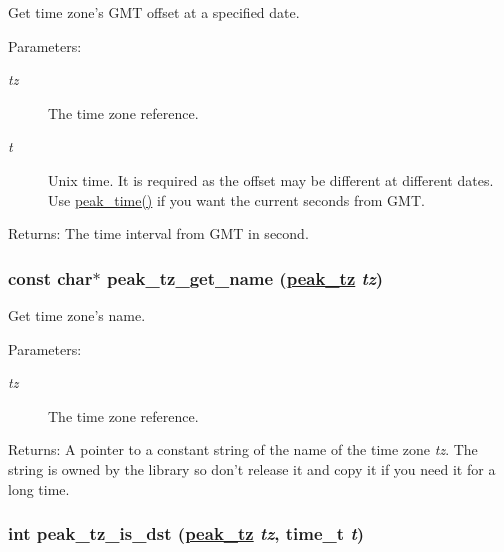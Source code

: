 Get time zone's GMT offset at a specified date. 

\begin{Desc}
\item[Parameters:]
\begin{description}
\item[{\em tz}]The time zone reference. \item[{\em t}]Unix time. It is required as the offset may be different at different dates. Use \hyperlink{group__time_ga6}{peak\_\-time()} if you want the current seconds from GMT.\end{description}
\end{Desc}
\begin{Desc}
\item[Returns:]The time interval from GMT in second. \end{Desc}
\hypertarget{group__tz_ga3}{
\subsubsection[peak\_\-tz\_\-get\_\-name]{\setlength{\rightskip}{0pt plus 5cm}const char$\ast$ peak\_\-tz\_\-get\_\-name (\hyperlink{group__tz_ga0}{peak\_\-tz} {\em tz})}}
\label{group__tz_ga3}


Get time zone's name. 

\begin{Desc}
\item[Parameters:]
\begin{description}
\item[{\em tz}]The time zone reference.\end{description}
\end{Desc}
\begin{Desc}
\item[Returns:]A pointer to a constant string of the name of the time zone {\em tz\/}. The string is owned by the library so don't release it and copy it if you need it for a long time. \end{Desc}
\hypertarget{group__tz_ga6}{
\subsubsection[peak\_\-tz\_\-is\_\-dst]{\setlength{\rightskip}{0pt plus 5cm}int peak\_\-tz\_\-is\_\-dst (\hyperlink{group__tz_ga0}{peak\_\-tz} {\em tz}, time\_\-t {\em t})}}
\label{group__tz_ga6}


